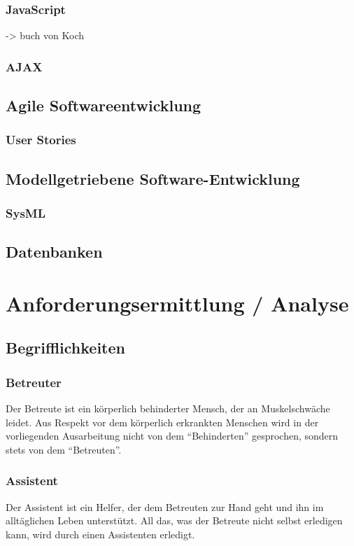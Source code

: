 \documentclass[12pt,a4paper,titlepage]{article} %
\begin{document}
\subsubsection{JavaScript}
-> buch von Koch
\subsubsection{AJAX}
\subsection{Agile Softwareentwicklung}
\subsubsection{User Stories}
\subsection{Modellgetriebene Software-Entwicklung}
\subsubsection{SysML}
\subsection{Datenbanken} %

\section{Anforderungsermittlung / Analyse} %
\subsection{Begrifflichkeiten}

\subsubsection{Betreuter}
Der Betreute ist ein körperlich behinderter Mensch, der an Muskelschwäche leidet. %
Aus Respekt vor dem körperlich erkrankten Menschen wird in der vorliegenden Ausarbeitung nicht von dem \enquote{Behinderten} gesprochen, sondern stets von dem \enquote{Betreuten}.

\subsubsection{Assistent}
Der Assistent ist ein Helfer, der dem Betreuten zur Hand geht und ihn im alltäglichen Leben unterstützt. All das, was der Betreute nicht selbst erledigen kann, wird durch einen Assistenten erledigt.
\end{document}
